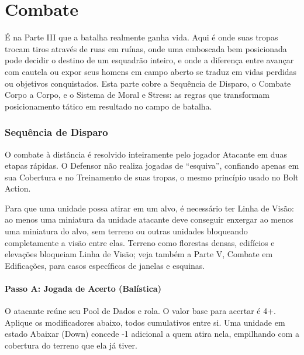 \part{Combate}

É na Parte III que a batalha realmente ganha vida. Aqui é onde suas tropas trocam tiros através de ruas em ruínas, onde uma emboscada bem posicionada pode decidir o destino de um esquadrão inteiro, e onde a diferença entre avançar com cautela ou expor seus homens em campo aberto se traduz em vidas perdidas ou objetivos conquistados. Esta parte cobre a Sequência de Disparo, o Combate Corpo a Corpo, e o Sistema de Moral e Stress: as regras que transformam posicionamento tático em resultado no campo de batalha.

\section{Sequência de Disparo}

O combate à distância é resolvido inteiramente pelo jogador Atacante em duas etapas rápidas. O Defensor não realiza jogadas de ``esquiva'', confiando apenas em sua Cobertura e no Treinamento de suas tropas, o mesmo princípio usado no Bolt Action.

Para que uma unidade possa atirar em um alvo, é necessário ter Linha de Visão: ao menos uma miniatura da unidade atacante deve conseguir enxergar ao menos uma miniatura do alvo, sem terreno ou outras unidades bloqueando completamente a visão entre elas. Terreno como florestas densas, edifícios e elevações bloqueiam Linha de Visão; veja também a Parte V, Combate em Edificações, para casos específicos de janelas e esquinas.

\subsection{Passo A: Jogada de Acerto (Balística)}

O atacante reúne seu Pool de Dados e rola. O valor base para acertar é 4+. Aplique os modificadores abaixo, todos cumulativos entre si. Uma unidade em estado Abaixar (Down) concede -1 adicional a quem atira nela, empilhando com a cobertura do terreno que ela já tiver.

